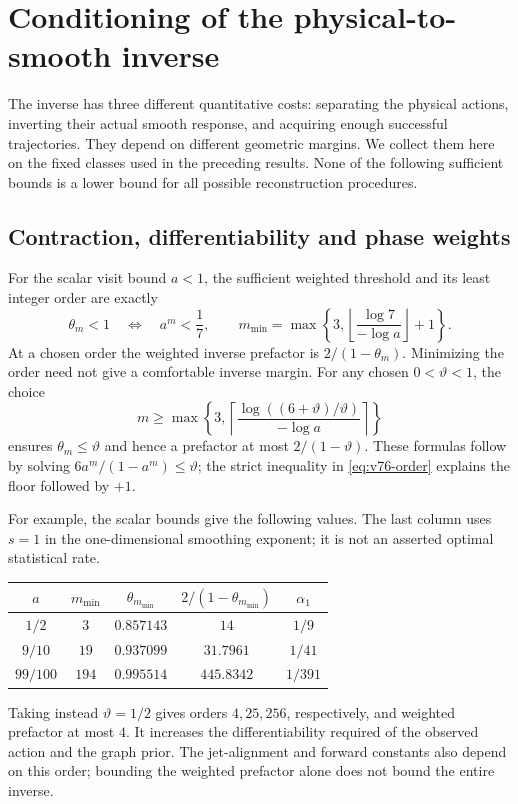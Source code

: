 \section{Conditioning of the physical-to-smooth inverse}
\label{sec:v76-conditioning}

The inverse has three different quantitative costs: separating the
physical actions, inverting their actual smooth response, and acquiring
enough successful trajectories.  They depend on different geometric
margins.  We collect them here on the fixed classes used in the preceding
results.  None of the following sufficient bounds is a lower bound for
all possible reconstruction procedures.

\subsection{Contraction, differentiability and phase weights}

For the scalar visit bound $a<1$, the sufficient weighted threshold and
its least integer order are exactly
\begin{equation}\label{eq:v76-order}
 \theta_m<1\quad\Longleftrightarrow\quad a^m<\frac17,
 \qquad m_{\min}=\max\left\{3,
       \left\lfloor\frac{\log7}{-\log a}\right\rfloor+1\right\}.
\end{equation}
At a chosen order the weighted inverse prefactor is
$2/(1-\theta_m)$.  Minimizing the order need not give a comfortable
inverse margin.  For any chosen $0<\vartheta<1$, the choice
\begin{equation}\label{eq:v76-order-margin}
 m\ge\max\left\{3,
  \left\lceil\frac{\log((6+\vartheta)/\vartheta)}{-\log a}
                   \right\rceil\right\}
\end{equation}
ensures $\theta_m\le\vartheta$ and hence a prefactor at most
$2/(1-\vartheta)$.  These formulas follow by solving
$6a^m/(1-a^m)\le\vartheta$; the strict inequality in
\eqref{eq:v76-order} explains the floor followed by $+1$.

For example, the scalar bounds give the following values.  The last
column uses $s=1$ in the one-dimensional smoothing exponent; it is not
an asserted optimal statistical rate.
\begin{center}
\begin{tabular}{ccccc}
\toprule
$a$ & $m_{\min}$ & $\theta_{m_{\min}}$ &
 $2/(1-\theta_{m_{\min}})$ & $\alpha_1$\\
\midrule
$1/2$ & $3$ & $0.857143$ & $14$ & $1/9$\\
$9/10$ & $19$ & $0.937099$ & $31.7961$ & $1/41$\\
$99/100$ & $194$ & $0.995514$ & $445.8342$ & $1/391$\\
\bottomrule
\end{tabular}
\end{center}
Taking instead $\vartheta=1/2$ gives orders $4,25,256$, respectively,
and weighted prefactor at most $4$.  It increases the differentiability
required of the observed action and the graph prior.  The jet-alignment
and forward constants also depend on this order; bounding the weighted
prefactor alone does not bound the entire inverse.


